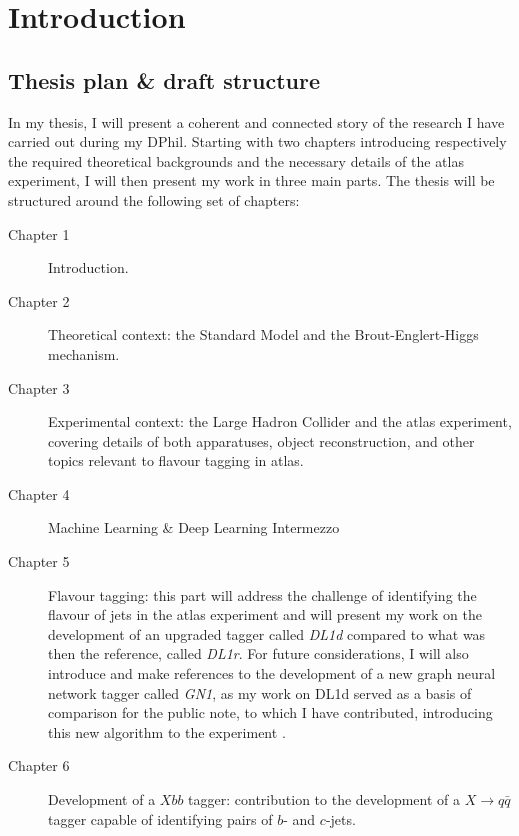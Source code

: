 \chapter{Introduction}
\ChapFrame

\section*{Thesis plan \& draft structure}
In my thesis, I will present a coherent and connected story of the research I have carried out during my DPhil. Starting with two chapters introducing respectively the required theoretical backgrounds and the necessary details of the \gls{atlas} experiment, I will then present my work in three main parts.  The thesis will be structured around the following set of chapters:
\begin{description}
\item[Chapter 1] Introduction. \\ \vspace{-15pt}
\item[Chapter 2] Theoretical context: the Standard Model and the Brout-Englert-Higgs mechanism. \\  \vspace{-15pt}
\item[Chapter 3] Experimental context: the Large Hadron Collider and the \gls{atlas} experiment, covering details of both apparatuses, object reconstruction, and other topics relevant to flavour tagging in \gls{atlas}. \\  \vspace{-15pt}
\item[Chapter 4] Machine Learning \& Deep Learning Intermezzo
\item[Chapter 5] Flavour tagging: this part will address the challenge of identifying the flavour of jets in the \gls{atlas} experiment and will present my work on the development of an upgraded tagger called \textit{DL1d} compared to what was then the reference, called \textit{DL1r}. For future considerations, I will also introduce and make references to the development of a new graph neural network tagger called \textit{GN1}, as my work on DL1d served as a basis of comparison for the public note, to which I have contributed, introducing this new algorithm to the experiment \cite{ATL-PHYS-PUB-2022-027}. \\  \vspace{-15pt}
\item[Chapter 6] Development of a $Xbb$ tagger: contribution to the development of a $X \rightarrow q\bar{q}$ tagger capable of identifying pairs of $b$- and $c$-jets.

\end{description}
